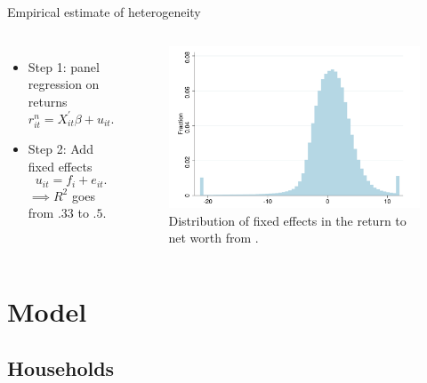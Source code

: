 \documentclass{beamer}
\begin{document}
\begin{frame}{Empirical estimate of heterogeneity}

     \begin{columns}
     \small
    \centering

    \begin{itemize}
    \item Step 1: panel regression on returns
    $$ r^{n}_{it} = X^{'}_{it} \beta + u_{it}. $$
    \item Step 2: Add fixed effects
    $$ u_{it} = f_{i} + e_{it}. $$
    $\implies R^2$ goes from $.33$ to $.5$.
    \end{itemize}


    \centering
    \begin{figure}
    \includegraphics[width=\textwidth]{Figures/Fagereng2020Fig8.png}
    \captionsetup{font=scriptsize}
    \caption{Distribution of fixed effects in the return to net worth from \cite{aflgdmlp20}.}
    \end{figure}
  \end{columns}

\end{frame}

\section{Model}
\subsection{Households}
\end{document}
